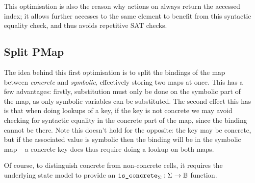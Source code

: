 
This optimisation is also the reason why actions on \PMap{} always return the accessed index; it allows further accesses to the same element to benefit from this syntactic equality check, and thus avoids repetitive SAT checks.

\subsection{Split PMap}

The idea behind this first optimisation is to split the bindings of the map between \emph{concrete} and \emph{symbolic}, effectively storing two maps at once. This has a few advantages: firstly, substitution must only be done on the symbolic part of the map, as only symbolic variables can be substituted. The second effect this has is that when doing lookups of a key, if the key is not concrete we may avoid checking for syntactic equality in the concrete part of the map, since the binding cannot be there. Note this doesn't hold for the opposite: the key may be concrete, but if the associated value is symbolic then the binding will be in the symbolic map -- a concrete key does thus require doing a lookup on both maps.

Of course, to distinguish concrete from non-concrete cells, it requires the underlying state model to provide an $\texttt{is\_concrete}_\Sigma: \Sigma\rightarrow \mathbb{B}$ function.

